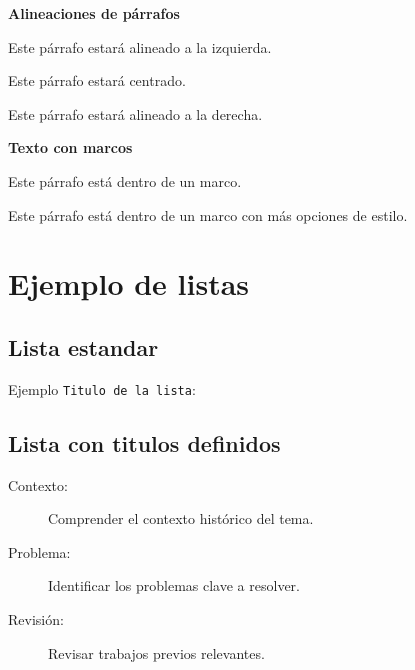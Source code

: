  
 \textbf{Alineaciones de párrafos}

 \begin{flushleft}
 Este párrafo estará alineado a la izquierda.
 \end{flushleft}
 
 \begin{center}
 Este párrafo estará centrado.
 \end{center}
 
 \begin{flushright}
 Este párrafo estará alineado a la derecha.
 \end{flushright}
 
 
\textbf{Texto con marcos}
 
 \begin{framed}
 Este párrafo está dentro de un marco.
 \end{framed}
 
 \begin{mdframed}
 Este párrafo está dentro de un marco con más opciones de estilo.
 \end{mdframed}
 
 \clearpage
 
 \section{Ejemplo de listas}
 
  \subsection{Lista estandar}
   Ejemplo \texttt{Titulo de la lista}:


  
  \subsection{Lista con titulos definidos}
   \begin{description}
      \item[Contexto:] Comprender el contexto histórico del tema.
      \item[Problema:] Identificar los problemas clave a resolver.
      \item[Revisión:] Revisar trabajos previos relevantes.
    \end{description}
    
